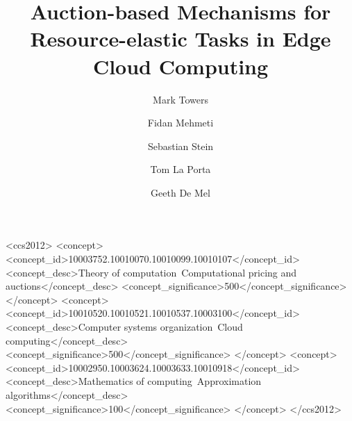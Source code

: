 \documentclass[manuscript,screen]{acmart}
\begin{document}
    \title{Auction-based Mechanisms for Resource-elastic Tasks in Edge Cloud Computing}

    \author{Mark Towers}

    \author{Fidan Mehmeti}

    \author{Sebastian Stein}

    \author{Tom La Porta}

    \author{Geeth De Mel}

    \renewcommand{\shortauthors}{Towers et al.}

    

\begin{CCSXML}
<ccs2012>
   <concept>
       <concept_id>10003752.10010070.10010099.10010107</concept_id>
       <concept_desc>Theory of computation~Computational pricing and auctions</concept_desc>
       <concept_significance>500</concept_significance>
       </concept>
   <concept>
       <concept_id>10010520.10010521.10010537.10003100</concept_id>
       <concept_desc>Computer systems organization~Cloud computing</concept_desc>
       <concept_significance>500</concept_significance>
       </concept>
   <concept>
       <concept_id>10002950.10003624.10003633.10010918</concept_id>
       <concept_desc>Mathematics of computing~Approximation algorithms</concept_desc>
       <concept_significance>100</concept_significance>
       </concept>
 </ccs2012>
\end{CCSXML}
\end{document}
